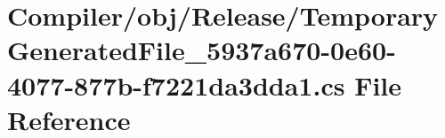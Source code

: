 \hypertarget{_compiler_2obj_2_release_2_temporary_generated_file__5937a670-0e60-4077-877b-f7221da3dda1_8cs}{}\section{Compiler/obj/\+Release/\+Temporary\+Generated\+File\+\_\+5937a670-\/0e60-\/4077-\/877b-\/f7221da3dda1.cs File Reference}
\label{_compiler_2obj_2_release_2_temporary_generated_file__5937a670-0e60-4077-877b-f7221da3dda1_8cs}
